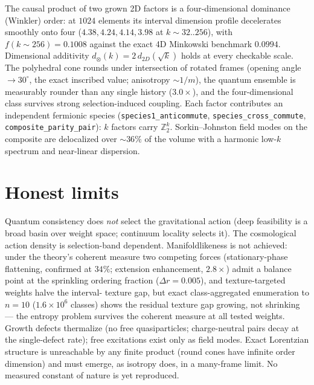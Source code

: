 \documentclass[11pt]{article}
\newcommand{\Z}{\mathbb{Z}}
\begin{document}
The causal product of two grown 2D factors is a four-dimensional
dominance (Winkler) order: at $1024$ elements its interval dimension
profile decelerates smoothly onto four
($4.38,4.24,4.14,3.98$ at $k\sim32..256$), with
$f(k{\sim}256)=0.1008$ against the exact 4D Minkowski benchmark
$0.0994$.  Dimensional additivity
$d_{\otimes}(k)=2\,d_{2D}(\sqrt k)$ holds at every checkable scale.
The polyhedral cone rounds under intersection of rotated frames
(opening angle $\to30^\circ$, the exact inscribed value; anisotropy
$\sim1/m$), the quantum ensemble is measurably rounder than any
single history ($3.0\times$), and the four-dimensional class survives
strong selection-induced coupling.  Each factor contributes an
independent fermionic species
(\texttt{species1\_anticommute}, \texttt{species\_cross\_commute},
\texttt{composite\_parity\_pair}): $k$ factors carry $\Z_2^k$.
Sorkin--Johnston field modes on the composite are delocalized over
$\sim36\%$ of the volume with a harmonic low-$k$ spectrum and
near-linear dispersion.

\section{Honest limits}

Quantum consistency does \emph{not} select the gravitational action
(deep feasibility is a broad basin over weight space; continuum
locality selects it).  The cosmological action density is
selection-band dependent.  Manifoldlikeness is not achieved: under the
theory's coherent measure two competing forces (stationary-phase
flattening, confirmed at $34\%$; extension enhancement, $2.8\times$)
admit a balance point at the sprinkling ordering fraction
($\Delta r=0.005$), and texture-targeted weights halve the interval-
texture gap, but exact class-aggregated enumeration to $n=10$
($1.6\times10^6$ classes) shows the residual texture gap growing,
not shrinking --- the entropy problem survives the coherent measure
at all tested weights.  Growth defects thermalize (no free
quasiparticles; charge-neutral pairs decay at the single-defect
rate); free excitations exist only as field modes.  Exact Lorentzian
structure is unreachable by any finite product (round cones have
infinite order dimension) and must emerge, as isotropy does, in a
many-frame limit.  No measured constant of nature is yet reproduced.
\end{document}
